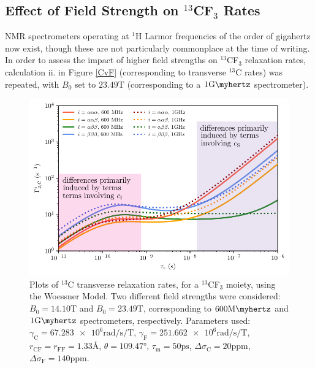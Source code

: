 \subsection{Effect of Field Strength on $^{13}$CF$_3$ Rates}
NMR spectrometers operating at $^1$H Larmor frequencies of the order of gigahertz now exist, though these are not particularly commonplace at the time of writing. In order to assess the impact of higher field strengths on $^{13}$CF$_3$ relaxation rates, calculation ii. in Figure \ref{CvF} (corresponding to transverse $^{13}$C rates) was repeated, with $B_0$ set to $\num{23.49} \si{\tesla}$ (corresponding to a $\num{1} \si{\giga \myhertz}$ spectrometer).\\
\begin{figure}
\centering
\includegraphics[scale=1]{./Figures/SimonsFigs/13CF3_1000.pdf}
\caption{Plots of $^{13}$C transverse relaxation rates, for a $^{13}$CF$_3$ moiety, using the Woessner Model. Two different field strengths were considered: $B_0 = \num{14.10} \si{\tesla}$ and $B_0 = \num{23.49} \si{\tesla}$, corresponding to $\num{600} \si{\mega \myhertz}$ and $\num{1} \si{\giga \myhertz}$ spectrometers, respectively. Parameters used: $\gamma_{\text{C}} = \num{67.283e6} \si{\radian \per \second \per \tesla}$, $\gamma_{\text{F}} = \num{251.662e6} \si{\radian \per \second \per \tesla}$, $r_{\text{CF}} = r_{\text{FF}} = \num{1.33} \si{\angstrom}$, $\theta = \ang{109.47}$, $\tau_{\text{m}} = \num{50} \si{\pico \second}$, $\Delta \sigma_{\text{C}} = \num{20} \text{ppm}$, $\Delta \sigma_{\text{F}} = \num{140} \text{ppm}$.}
\label{13CF3_1000}
\end{figure}
